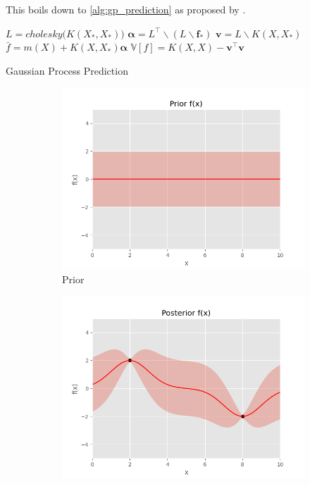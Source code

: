 This boils down to \cref{alg:gp_prediction} as proposed by \cite{rasmussen}.
\begin{algorithm}[h]
\SetAlgoLined
{}

$L = cholesky\big(K(X_*, X_*)\big)$\;
$\boldsymbol{\alpha} = L^\intercal \backslash (L \backslash \boldsymbol{f}_*)$\;
$\boldsymbol{v} = L \backslash K(X, X_*)$\;
$\bar{f} = m(X) + K(X, X_*) \boldsymbol{\alpha}$\;
$\mathbb{V}[f] = K(X, X) - \boldsymbol{v}^\intercal \boldsymbol{v}$\;
\caption{Gaussian Process Prediction}
\label{alg:gp_prediction}
\end{algorithm}

\begin{figure}[h]
    \centering
    \begin{subfigure}{0.49\textwidth}
        \includegraphics[width=\textwidth]{figures/introduction-gp/prior.png}
        \caption{Prior}
        \label{fig:gp_prior}
    \end{subfigure}
    \begin{subfigure}{0.49\textwidth}
        \includegraphics[width=\textwidth]{figures/introduction-gp/posterior.png}

\end{subfigure}
\end{figure}
